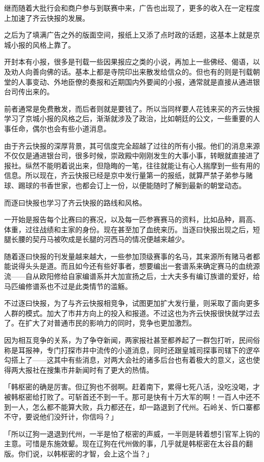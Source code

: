 继而随着大批行会和商户参与到联赛中来，广告也出现了，更多的收入在一定程度上加速了齐云快报的发展。

之后为了填满广告之外的版面空间，报纸上又添了点时政的话题，这基本上就是京城小报的风格上靠了。

开封本有小报，很多是刊载一些因果报应之类的小说，再加上一些佛经、偈语，以及劝人向善向佛的话。基本上都是寺院印出来散发给信众的。但也有的则是刊载朝堂的人事变动、外地臣僚的奏报和近期国内外要闻的小报，通常就是直接从通进银台司传出来的。

前者通常是免费散发，而后者则就是要钱了。所以当同样要人花钱来买的齐云快报学习了京城小报的风格之后，渐渐就涉及了政治，比如朝廷的公文，一些重要的人事任命，偶尔也会有些小道消息。

由于齐云快报的深厚背景，其可信度完全超越了过往的所有小报。他们的消息来源不仅仅是通进银台司，很多时候，崇政殿中刚刚发生的大事小事，转眼就直接进了报社。纵然不能明着说出来，但隐晦的一笔，往往就能让有心人揣摩到一些有用的信息。所以现在，齐云快报已经是京中发行量第一的报纸，就算严禁子弟参与赌球、踢球的书香世家，也都会订上一份，以便能随时了解到最新的朝堂动态。

而逐曰快报也学习了齐云快报的路线和风格。

一开始是报告每个比赛曰的赛况，以及每一匹参赛赛马的资料，比如品种，肩高、体重，过往战绩和主家的身份。现在甚至加了血统来历。当逐曰快报出现之后，短腿长腰的契丹马被吹成是长腿的河西马的情况便越来越少。

随着逐曰快报的刊发量越来越大，一些参加顶级赛事的名马，其来源所有赌马者都能说得头头是道。而且如今还有些好事者，想要编出一套谱系来确定赛马的血统源流——自从欧阳修给自家编谱系并大加宣扬之后，士大夫多有编订族谱的爱好，给马匹编修谱系也不过是此类情节的滥觞。

不过逐曰快报，为了与齐云快报相竞争，试图更加扩大发行量，则采取了面向更多人群的模式。加大了市井方向上的投入和报道。不过这也为齐云快报很快就学过去了。在扩大了对普通市民的影响力的同时，竞争也更加激烈。

因为相互竞争的关系，为了争夺新闻，两家报社甚至都养起了一群包打听，民间俗称是耳报神，专门打探市井中流传的小道消息，同时还跟皇城司探事司辖下的逻卒勾搭上了——这其中有些消息，对两大会社的诸多后台也有着极大的意义，这也使得两大报社在搜集市井新闻时有了更大的热情。

「韩枢密的确是厉害。但辽狗也不弱啊。赶着南下，累得七死八活，没吃没喝，才被韩枢密给打败了。可斩首还不到一千。那可是快有十万大军的啊！一百人中还不到一人，怎么都不能算大败，兵力都还在，却一路退到了代州。石岭关、忻口寨都不守，要说他们没歼计，你信吗？」

「所以辽狗一退退到代州，一半是怕了枢密的声威，一半则是转着想引官军上钩的主意。可惜是东施效颦。现在辽狗在代州做的事，几乎就是韩枢密在太谷县的翻版。你们说，以韩枢密的才智，会上这个当？」

